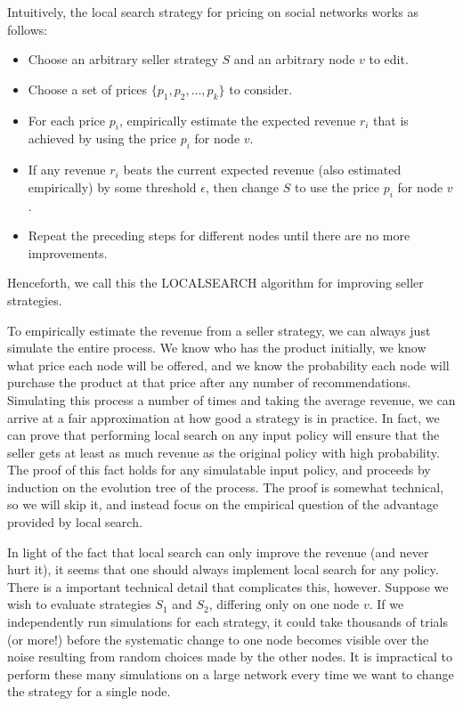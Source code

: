 \documentclass[letterpaper,twoside]{article}
\newcommand{\LS}{\textrm{L{\scriptsize OCAL}\-S{\scriptsize EARCH}}}
\begin{document}
Intuitively, the local search strategy for pricing on social networks works as follows:
\begin{itemize}
    \item Choose an arbitrary seller strategy $S$ and an arbitrary node $v$ to edit.
    \item Choose a set of prices $\{p_1, p_2, \ldots, p_k\}$ to consider.
    \item For each price $p_i$, empirically estimate the expected revenue $r_i$ that is
       achieved by using the price $p_i$ for node $v$.
    \item If any revenue $r_i$ beats the current expected revenue (also estimated
       empirically) by some threshold $\epsilon$, then change $S$ to use the price $p_i$
       for node $v$.
    \item Repeat the preceding steps for different nodes until there are no more improvements.
\end{itemize}
Henceforth, we call this the \LS{} algorithm for improving seller strategies.

To empirically estimate the revenue from a seller strategy, we can always
just simulate the entire process. We know who has the product initially, we
know what price each node will be offered, and we know the probability each
node will purchase the product at that price after any number of
recommendations. Simulating this process a number of times and taking the
average revenue, we can arrive at a fair approximation at how good a strategy
is in practice. In fact, we can prove that performing local search on any
input policy will ensure that the seller gets at least as much revenue as the
original policy with high probability. The proof of this fact holds for any
simulatable input policy, and proceeds by induction on the evolution tree of
the process. The proof is somewhat technical, so we will skip it, and instead
focus on the empirical question of the advantage provided by local search.

In light of the fact that local search can only improve the revenue (and never
hurt it), it seems that one should always implement local search for any
policy.  There is a important technical detail that complicates this,
however. Suppose we wish to evaluate strategies $S_1$ and $S_2$, differing
only on one node $v$. If we independently run simulations for each strategy,
it could take thousands of trials (or more!) before the systematic change to
one node becomes visible over the noise resulting from random choices made by
the other nodes. It is impractical to perform these many simulations on a
large network every time we want to change the strategy for a single node.
\end{document}
